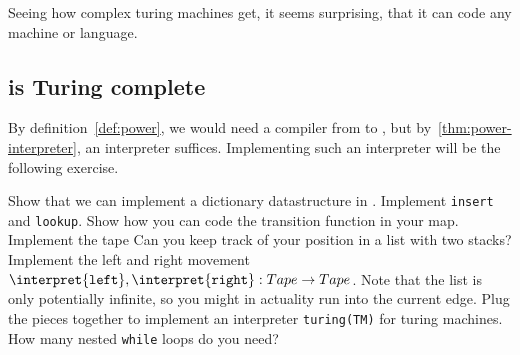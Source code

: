 Seeing how complex turing machines get, it seems surprising, that it can code 
any machine or language.

\subsection{\WHILE is Turing complete}
By definition~\ref{def:power}, we would need a compiler from \TM to \WHILE, 
but by~\ref{thm:power-interpreter}, an interpreter suffices. Implementing such an 
interpreter will be the following exercise.

\begin{Exercise}[title={Interpreter for \TM},label={exc:tm},difficulty=2]
	\Question Show that we can implement a dictionary datastructure in \WHILE\@.
		Implement {\tt insert} and {\tt lookup}.
	\Question Show how you can code the transition function in your map.
	\Question Implement the tape
		\subQuestion Can you keep track of your position in a list with two stacks?
		\subQuestion Implement the left and right movement 
		$\interpret{{\tt left}},\interpret{{\tt right}} : Tape \rightarrow Tape$. Note that the list is 
			only potentially infinite, so you might in actuality run into the current edge.
	\Question Plug the pieces together to implement an interpreter {\tt turing(TM)} for turing machines.
		\subQuestion How many nested {\tt while} loops do you need?
\end{Exercise}
